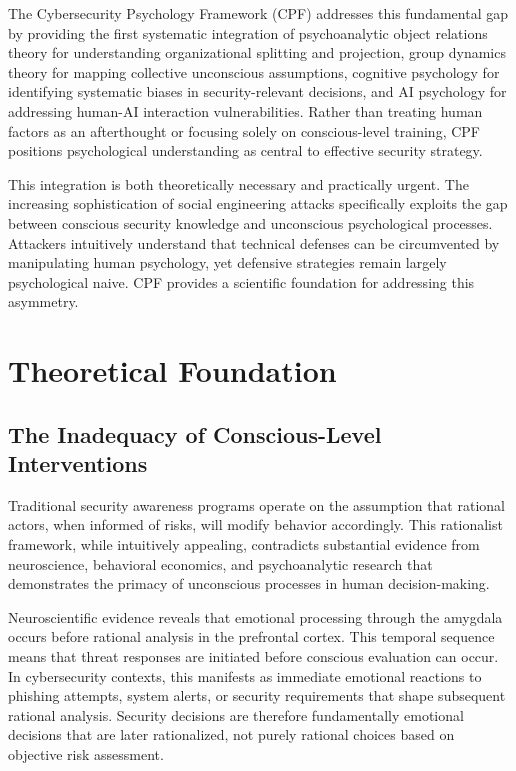\documentclass[11pt,a4paper]{article}
\begin{document}
The Cybersecurity Psychology Framework (CPF) addresses this fundamental gap by providing the first systematic integration of psychoanalytic object relations theory for understanding organizational splitting and projection, group dynamics theory for mapping collective unconscious assumptions, cognitive psychology for identifying systematic biases in security-relevant decisions, and AI psychology for addressing human-AI interaction vulnerabilities. Rather than treating human factors as an afterthought or focusing solely on conscious-level training, CPF positions psychological understanding as central to effective security strategy.

This integration is both theoretically necessary and practically urgent. The increasing sophistication of social engineering attacks specifically exploits the gap between conscious security knowledge and unconscious psychological processes. Attackers intuitively understand that technical defenses can be circumvented by manipulating human psychology, yet defensive strategies remain largely psychological naive. CPF provides a scientific foundation for addressing this asymmetry.

\section{Theoretical Foundation}

\subsection{The Inadequacy of Conscious-Level Interventions}

Traditional security awareness programs operate on the assumption that rational actors, when informed of risks, will modify behavior accordingly\cite{ajzen1991}. This rationalist framework, while intuitively appealing, contradicts substantial evidence from neuroscience, behavioral economics, and psychoanalytic research that demonstrates the primacy of unconscious processes in human decision-making.

Neuroscientific evidence reveals that emotional processing through the amygdala occurs before rational analysis in the prefrontal cortex\cite{ledoux2000}. This temporal sequence means that threat responses are initiated before conscious evaluation can occur. In cybersecurity contexts, this manifests as immediate emotional reactions to phishing attempts, system alerts, or security requirements that shape subsequent rational analysis. Security decisions are therefore fundamentally emotional decisions that are later rationalized, not purely rational choices based on objective risk assessment.
\end{document}
